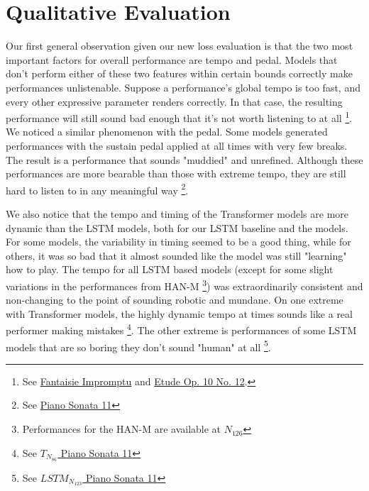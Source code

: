 \section{Qualitative Evaluation}\label{sec:qualitative-analysis}
Our first general observation given our new loss evaluation is that the two most important factors for overall performance are tempo and pedal. Models that don't perform either of these two features within certain bounds correctly make performances unlistenable. Suppose a performance's global tempo is too fast, and every other expressive parameter renders correctly. In that case, the resulting performance will still sound bad enough that it's not worth listening to at all \footnote{See \href{https://ui.neptune.ai/richt3211/thesis/e/THESIS-86/artifacts}{ Fantaisie Impromptu} and \href{https://ui.neptune.ai/richt3211/thesis/e/THESIS-126/artifacts}{ Etude Op. 10 No. 12}.}. We noticed a similar phenomenon with the pedal. Some models generated performances with the sustain pedal applied at all times with very few breaks. The result is a performance that sounds "muddied" and unrefined. Although these performances are more bearable than those with extreme tempo, they are still hard to listen to in any meaningful way \footnote{See \href{https://ui.neptune.ai/richt3211/thesis/e/THESIS-125/artifacts}{ Piano Sonata 11} }. 

\newcommand{\lm}[1]{$LSTM_{N_{#1}}$}

We also notice that the tempo and timing of the Transformer models are more dynamic than the LSTM models, both for our LSTM baseline and the \vnet{} models. For some models, the variability in timing seemed to be a good thing, while for others, it was so bad that it almost sounded like the model was still "learning" how to play. The tempo for all LSTM based models (except for some slight variations in the performances from HAN-M \footnote{Performances for the HAN-M are available at \href{https://ui.neptune.ai/richt3211/thesis/e/THESIS-162/artifacts}{$N_{126}$}}) was extraordinarily consistent and non-changing to the point of sounding robotic and mundane. On one extreme with Transformer models, the highly dynamic tempo at times sounds like a real performer making mistakes \footnote{See \href{https://ui.neptune.ai/richt3211/thesis/e/THESIS-86/artifacts}{$T_{N_{86}}$ Piano Sonata 11}}. The other extreme is performances of some LSTM models that are so boring they don't sound "human" at all \footnote{See \href{https://ui.neptune.ai/richt3211/thesis/e/THESIS-123/artifacts}{\lm{123} Piano Sonata 11}}. 

